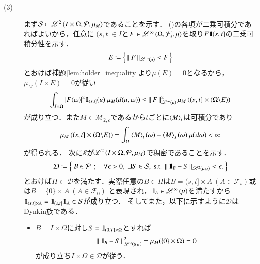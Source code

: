 \begin{prf}
\begin{description}
			\item[(3)]
				まず$\mathcal{S} \subset \mathscr{L}^{2} \left(I \times \Omega,\mathcal{P},\mu_M\right)$であることを示す．
				()の各項が二乗可積分であればよいから，任意に
				$(s,t] \in I$と$F \in \mathscr{L}^{\infty} \left(\Omega,\mathcal{F}_s,\mu\right)$を取り$F \mbox{1}\hspace{-0.25em}\mbox{l}{(s,t]}$の二乗可積分性を示す．
				\begin{align}
					E \coloneqq \left\{\, \left\|\, F\, \right\|_{\mathscr{L}^{\infty} \left(\mu\right)} < F\, \right\}
				\end{align}
				とおけば補題\ref{lem:holder_inequality}より$\mu(E) = 0$となるから，$\mu_M(I \times E) = 0$が従い
				\begin{align}
					\int_{I \times \Omega} |F(\omega)|^2 \mbox{1}\hspace{-0.25em}\mbox{l}_{(s,t]}(u)\ \mu_M(d(u,\omega)) 
					\leq \left\|\, F\, \right\|_{\mathscr{L}^{\infty} \left(\mu\right)}^2 \mu_M\left((s,t] \times (\Omega \backslash E)\right) 
				\end{align}
				が成り立つ．また$M \in \mathcal{M}_{2,c}$であるから$t$ごとに$\inprod<M>_t$は可積分であり
				\begin{align}
					\mu_M\left((s,t] \times (\Omega \backslash E)\right) = \int_{\Omega} \inprod<M>_t(\omega) - \inprod<M>_s(\omega)\ \mu(d\omega) < \infty
				\end{align}
				が得られる．
				次に$\mathcal{S}$が$\mathscr{L}^{2} \left(I \times \Omega,\mathcal{P},\mu_M\right)$で稠密であることを示す．
				\begin{align}
					\mathcal{D} \coloneqq \left\{\ B \in \mathcal{P}\ \, ; \quad \mbox{$\forall \epsilon > 0,\ \exists S \in \mathcal{S},\ \mbox{s.t.}\ \left\|\, \mbox{1}\hspace{-0.25em}\mbox{l}_B - S\, \right\|_{\mathscr{L}^{2} \left(\mu_M\right)} < \epsilon.$}\ \right\}
				\end{align}
				とおけば$\Pi \subset \mathcal{D}$を満たす．実際任意の$B \in \Pi$は$B = (s,t] \times A\ (A \in \mathcal{F}_s)$或は$B = \{0\} \times A\ (A \in \mathcal{F}_0)$
				と表現され，$\mbox{1}\hspace{-0.25em}\mbox{l}_A \in \mathscr{L}^{\infty} \left(\mu\right)$を満たすから$\mbox{1}\hspace{-0.25em}\mbox{l}_{(s,t] \times A} = \mbox{1}\hspace{-0.25em}\mbox{l}_{(s,t]} \mbox{1}\hspace{-0.25em}\mbox{l}_A \in \mathcal{S}$が成り立つ．
				そしてまた，以下に示すように$\mathcal{D}$はDynkin族である．
				\begin{itemize}
					\item $B = I \times \Omega$に対し$S = \mbox{1}\hspace{-0.25em}\mbox{l}_{(0,T] \times \Omega}$とすれば
						\begin{align}
							\left\|\, \mbox{1}\hspace{-0.25em}\mbox{l}_B - S\, \right\|_{\mathscr{L}^{2} \left(\mu_M\right)}^2
							= \mu_M(\{0\} \times \Omega)
							= 0
						\end{align}
						が成り立ち$I \times \Omega \in \mathcal{D}$が従う．
					

\end{itemize}
\end{description}
\end{prf}
